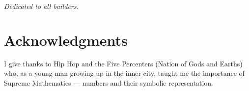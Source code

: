 \thispagestyle{empty}
\vspace*{2.5in}
\begin{center}
  {\Large\itshape Dedicated to all builders.\par}
\end{center}
\cleardoublepage

\chapter*{Acknowledgments}

I give thanks to Hip Hop and the Five Percenters (Nation of Gods and
Earths) who, as a young man growing up in the inner city, taught me the
importance of Supreme Mathematics --- numbers and their symbolic
representation.

\clearpage

{%
  \hypersetup{linkcolor=black}%
  \tableofcontents*
}
\clearpage

{%
  \hypersetup{linkcolor=black}%
  \listoffigures
}
\clearpage
